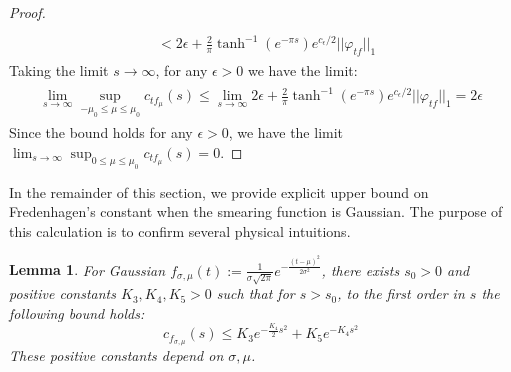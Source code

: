 \documentclass[a4paper,11pt]{article}
\newtheorem{lemma}[theorem]{Lemma}
\theoremstyle{definition}
\theoremstyle{remark}
\begin{document}
\begin{proof}
\begin{align}
\begin{split}
            \\&
            < 2\epsilon + \frac{2}{\pi}\tanh^{-1}(e^{-\pi s})e^{c_\epsilon / 2}||\varphi_{tf}||_1
        \end{split}    
    \end{align}
    Taking the limit $s\rightarrow\infty$, for any $\epsilon > 0$ we have the limit:
    \begin{align}
        \begin{split}
            \lim_{s\rightarrow\infty}\sup_{-\mu_0\leq \mu\leq \mu_0}c_{tf_\mu}(s) \leq \lim_{s\rightarrow\infty}2\epsilon + \frac{2}{\pi}\tanh^{-1}(e^{-\pi s})e^{c_\epsilon / 2}||\varphi_{tf}||_1 = 2\epsilon
        \end{split}
    \end{align}
    Since the bound holds for any $\epsilon > 0$, we have the limit $\lim_{s\rightarrow\infty}\sup_{0\leq \mu\leq \mu_0}c_{tf_\mu}(s) = 0$.
\end{proof}
In the remainder of this section, we provide explicit upper bound on Fredenhagen's constant when the smearing function is Gaussian. The purpose of this calculation is to confirm several physical intuitions.
\begin{lemma}
    For Gaussian $f_{\sigma,\mu}(t) := \frac{1}{\sigma\sqrt{2\pi}}e^{-\frac{(t - \mu)^2}{2\sigma^2}}$, there exists $s_0 > 0$ and positive constants $K_3, K_4, K_5 > 0$ such that for $s > s_0$, to the first order in $s$ the following bound holds:
    \begin{equation}
        c_{f_{\sigma,\mu}}(s) \leq K_3e^{-\frac{K_4}{2}s^2} + K_5e^{-K_4 s^2}
    \end{equation}
    These positive constants depend on $\sigma,\mu$.
\end{lemma}
\end{document}
